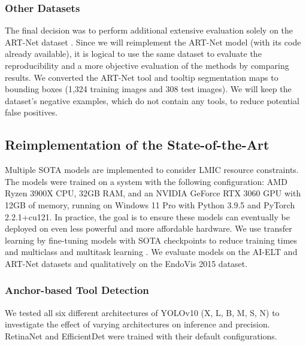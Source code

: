
\subsubsection{Other Datasets}

The final decision was to perform additional extensive evaluation solely on the ART-Net dataset \cite{hasan_detection_2021}. Since we will reimplement the ART-Net model (with its code already available), it is logical to use the same dataset to evaluate the reproducibility and a more objective evaluation of the methods by comparing results. We converted the ART-Net tool and tooltip segmentation maps to bounding boxes (1,324 training images and 308 test images). We will keep the dataset's negative examples, which do not contain any tools, to reduce potential false positives.

\subsection{Reimplementation of the State-of-the-Art}

Multiple SOTA models are implemented to consider LMIC resource constraints. The models were trained on a system with the following configuration: AMD Ryzen 3900X CPU, 32GB RAM, and an NVIDIA GeForce RTX 3060 GPU with 12GB of memory, running on Windows 11 Pro with Python 3.9.5 and PyTorch 2.2.1+cu121. In practice, the goal is to ensure these models can eventually be deployed on even less powerful and more affordable hardware. We use transfer learning by fine-tuning models with SOTA checkpoints to reduce training times and multiclass and multitask learning \cite{alabi_multitask_2024}. We evaluate models on the AI-ELT and ART-Net datasets and qualitatively on the EndoVis 2015 dataset.

\subsubsection{Anchor-based Tool Detection}

We tested all six different architectures of YOLOv10 (X, L, B, M, S, N) to investigate the effect of varying architectures on inference and precision. RetinaNet and EfficientDet were trained with their default configurations.

